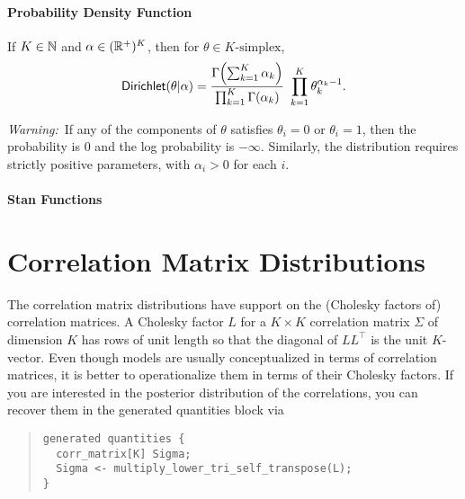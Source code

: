\subsubsection{Probability Density Function}

If $K \in \nats$ and $\alpha \in (\posreals)^{K}$, then for
$\theta \in \mbox{$K$-simplex}$, 
\[
\distro{Dirichlet}(\theta|\alpha)
= 
\frac{\Gamma \! \left( \sum_{k=1}^K \alpha_k \right)}
     {\prod_{k=1}^K \Gamma(\alpha_k)}
\
\prod_{k=1}^K \theta_k^{\alpha_k - 1}
.
\]

{\it Warning:}\ If any of the components of $\theta$ satisfies
$\theta_i = 0$ or $\theta_i = 1$, then the probability is 0 and the log
probability is $-\infty$.  Similarly, the distribution requires
strictly positive parameters, with $\alpha_i > 0$ for each $i$.



\subsubsection{Stan Functions}

\begin{description}
\end{description}
%
\begin{description}
\end{description}


\chapter{Correlation Matrix Distributions}

\noindent
The correlation matrix distributions have support on the (Cholesky
factors of) correlation matrices.  A Cholesky factor $L$ for a $K
\times K$ correlation matrix $\Sigma$ of dimension $K$ has rows of unit
length so that the diagonal of $L L^{\top}$ is the unit $K$-vector. Even
though models are usually conceptualized in terms of correlation matrices,
it is better to operationalize them in terms of their Cholesky factors.
If you are interested in the posterior distribution of the correlations,
you can recover them in the generated quantities block via
%
\begin{quote}
\begin{Verbatim}
generated quantities {
  corr_matrix[K] Sigma;
  Sigma <- multiply_lower_tri_self_transpose(L);
}
\end{Verbatim}
\end{quote}
%
